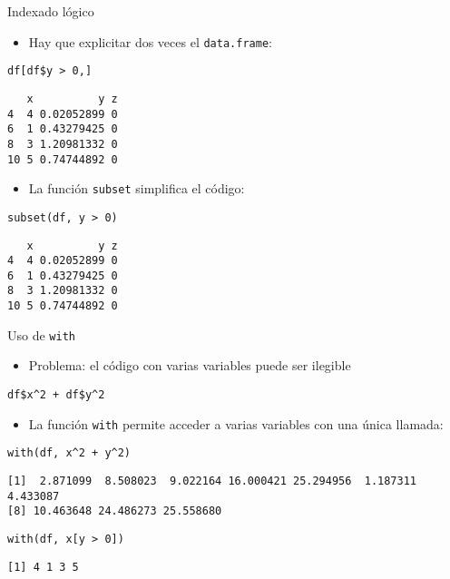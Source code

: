 \documentclass[xcolor={usenames,svgnames,dvipsnames}]{beamer}
\begin{document}
\begin{frame}[fragile,label={sec:org2e16196}]{Indexado lógico}
 \begin{itemize}
\item Hay que explicitar dos veces el \texttt{data.frame}:
\end{itemize}
\lstset{language=r,label= ,caption= ,captionpos=b,numbers=none}
\begin{lstlisting}
df[df$y > 0,]
\end{lstlisting}

\begin{verbatim}
   x          y z
4  4 0.02052899 0
6  1 0.43279425 0
8  3 1.20981332 0
10 5 0.74744892 0
\end{verbatim}

\begin{itemize}
\item La función \texttt{subset} simplifica el código:
\end{itemize}
\lstset{language=r,label= ,caption= ,captionpos=b,numbers=none}
\begin{lstlisting}
subset(df, y > 0)
\end{lstlisting}

\begin{verbatim}
   x          y z
4  4 0.02052899 0
6  1 0.43279425 0
8  3 1.20981332 0
10 5 0.74744892 0
\end{verbatim}
\end{frame}

\begin{frame}[fragile,label={sec:orgf50f86d}]{Uso de \texttt{with}}
 \begin{itemize}
\item Problema: el código con varias variables puede ser ilegible
\end{itemize}
\lstset{language=r,label= ,caption= ,captionpos=b,numbers=none}
\begin{lstlisting}
df$x^2 + df$y^2
\end{lstlisting}
\begin{itemize}
\item La función \texttt{with} permite acceder a varias variables con una única llamada:
\end{itemize}
\lstset{language=r,label= ,caption= ,captionpos=b,numbers=none}
\begin{lstlisting}
with(df, x^2 + y^2)
\end{lstlisting}

\begin{verbatim}
[1]  2.871099  8.508023  9.022164 16.000421 25.294956  1.187311  4.433087
[8] 10.463648 24.486273 25.558680
\end{verbatim}

\lstset{language=r,label= ,caption= ,captionpos=b,numbers=none}
\begin{lstlisting}
with(df, x[y > 0])
\end{lstlisting}

\begin{verbatim}
[1] 4 1 3 5
\end{verbatim}
\end{frame}
\end{document}
